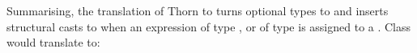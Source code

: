 \documentclass[acmlarge, anonymous, authordraft]{acmart}
\begin{document}
%
%
%


%
%
%
%
%
%
%  
 

Summarising,
the translation of Thorn to \kafka turns optional types to \any and
inserts structural casts to \C when an expression of type \any, or of type
\dt\C is assigned to a \C.  Class \A would translate to:
\end{document}
